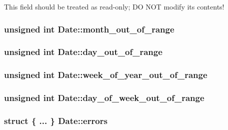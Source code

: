 This field should be treated as read-\/only; D\-O N\-O\-T modify its contents! \hypertarget{structDate_a29e199da53dd2c946b41ee97dbafd2cb}{
\subsubsection[{month\-\_\-out\-\_\-of\-\_\-range}]{\setlength{\rightskip}{0pt plus 5cm}unsigned int Date\-::month\-\_\-out\-\_\-of\-\_\-range}}\label{structDate_a29e199da53dd2c946b41ee97dbafd2cb}
\hypertarget{structDate_a75853bff950be7a8c71017f35e7b0003}{
\subsubsection[{day\-\_\-out\-\_\-of\-\_\-range}]{\setlength{\rightskip}{0pt plus 5cm}unsigned int Date\-::day\-\_\-out\-\_\-of\-\_\-range}}\label{structDate_a75853bff950be7a8c71017f35e7b0003}
\hypertarget{structDate_a9e29181d3d839953ee7bae10aa45bf2d}{
\subsubsection[{week\-\_\-of\-\_\-year\-\_\-out\-\_\-of\-\_\-range}]{\setlength{\rightskip}{0pt plus 5cm}unsigned int Date\-::week\-\_\-of\-\_\-year\-\_\-out\-\_\-of\-\_\-range}}\label{structDate_a9e29181d3d839953ee7bae10aa45bf2d}
\hypertarget{structDate_a5dc47ea0e7d16cc6c95321c6b8bba51b}{
\subsubsection[{day\-\_\-of\-\_\-week\-\_\-out\-\_\-of\-\_\-range}]{\setlength{\rightskip}{0pt plus 5cm}unsigned int Date\-::day\-\_\-of\-\_\-week\-\_\-out\-\_\-of\-\_\-range}}\label{structDate_a5dc47ea0e7d16cc6c95321c6b8bba51b}
\hypertarget{structDate_a69b79f56137adf67014f4009f0047c79}{
\subsubsection[{errors}]{\setlength{\rightskip}{0pt plus 5cm}struct \{ ... \}   Date\-::errors}}\label{structDate_a69b79f56137adf67014f4009f0047c79}


